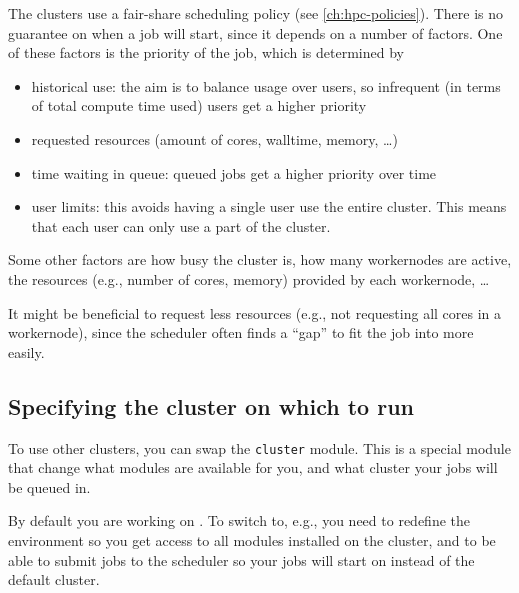 The \hpcInfra clusters use a fair-share scheduling policy (see \autoref{ch:hpc-policies}). There is no guarantee on when a
job will start, since it depends on a number of factors. One of these factors is
the priority of the job, which is determined by
\begin{itemize}
    \item historical use: the aim is to balance usage over users, so
        infrequent (in terms of total compute time used) users get a higher priority

    \item requested resources (amount of cores, walltime, memory, \ldots)

    \item time waiting in queue: queued jobs get a higher priority over time

    \item user limits: this avoids having a single user use the entire cluster.
        This means that each user can only use a part of the cluster.

\end{itemize}
Some other factors are how busy the cluster is, how many workernodes are active,
the resources (e.g., number of cores, memory) provided by each workernode, \ldots

It might be beneficial to request less resources (e.g., not requesting all cores
in a workernode), since the scheduler often finds a ``gap'' to fit the job into
more easily.

\fi

\ifgent

\subsection{Specifying the cluster on which to run}
\label{subsec:specifying-the-cluster-on-which-to-run}

To use other clusters, you can swap the \lstinline|cluster| module.
This is a special module that change what modules are available for you,
and what cluster your jobs will be queued in.

By default you are working on . To switch to, e.g., \othercluster you need
to redefine the environment so you get access to all modules installed on
the \othercluster cluster, and to be able to submit jobs to the \othercluster scheduler
so your jobs will start on \othercluster instead of the default  cluster.

\begin{prompt}
\end{prompt}

